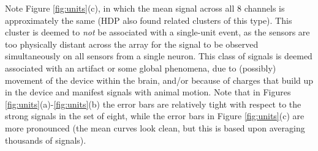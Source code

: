 \documentclass[journal]{IEEEtran}
\begin{document}
Note Figure \ref{fig:units}(c), in which the mean signal across all 8 channels is approximately the same (HDP also found related clusters of this type). This cluster is deemed to \emph{not} be associated with a single-unit event, as the sensors are too physically distant across the array for the signal to be observed simultaneously on all sensors from a single neuron. This class of signals is deemed associated with an artifact or some global phenomena, due to (possibly) movement of the device within the brain, and/or because of charges that build up in the device and manifest signals with animal motion. Note that in Figures \ref{fig:units}(a)-\ref{fig:units}(b) the error bars are relatively tight with respect to the strong signals in the set of eight, while the error bars in Figure \ref{fig:units}(c) are more pronounced (the mean curves look clean, but this is based upon averaging thousands of signals).
%


\end{document}
